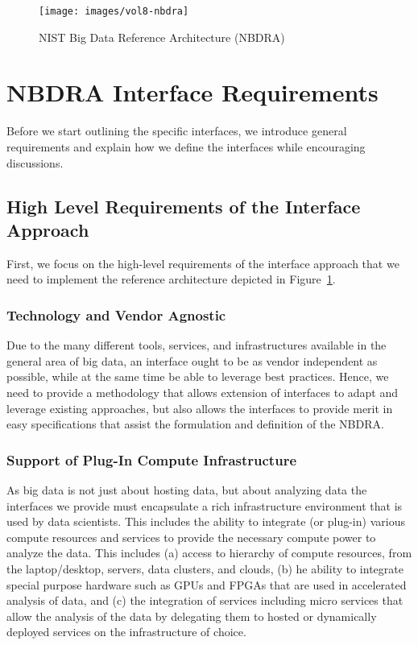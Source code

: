 \documentclass[10pt]{article}
\begin{document}
\begin{figure}[h]\centering
\texttt{[image: images/vol8-nbdra]}
\caption{NIST Big Data Reference Architecture (NBDRA)}
\label{F:architecture}
\end{figure}



\section{NBDRA Interface Requirements}

Before we start outlining the specific interfaces, we introduce
general requirements and explain how we define the interfaces while
encouraging discussions.

\subsection{High Level Requirements of the Interface Approach}

First, we focus on the high-level requirements of the interface
approach that we need to implement the reference architecture depicted
in Figure~\ref{F:architecture}.

\subsubsection{Technology and Vendor Agnostic}

Due to the many different tools, services, and infrastructures
available in the general area of big data, an interface ought to be as
vendor independent as possible, while at the same time be able to
leverage best practices. Hence, we need to provide a methodology that
allows extension of interfaces to adapt and leverage existing
approaches, but also allows the interfaces to provide merit in easy
specifications that assist the formulation and definition of the
NBDRA.

\subsubsection{Support of Plug-In Compute Infrastructure}

As big data is not just about hosting data, but about analyzing data
the interfaces we provide must encapsulate a rich infrastructure
environment that is used by data scientists. This includes the ability
to integrate (or plug-in) various compute resources and services to
provide the necessary compute power to analyze the data. This includes
(a) access to hierarchy of compute resources, from the laptop/desktop,
servers, data clusters, and clouds, (b) he ability to integrate
special purpose hardware such as GPUs and FPGAs that are used in
accelerated analysis of data, and (c) the integration of services
including micro services that allow the analysis of the data by
delegating them to hosted or dynamically deployed services on the
infrastructure of choice.
\end{document}
